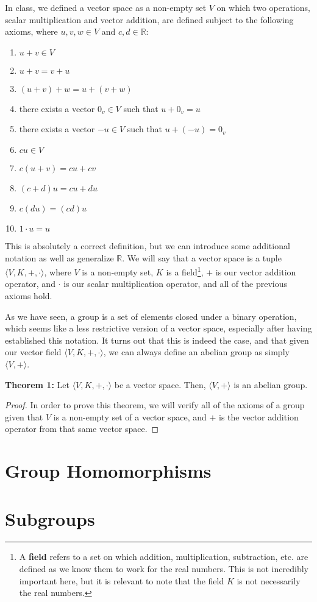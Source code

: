 \documentclass{article}
\newcommand{\R}{\mathbb{R}}
\newcommand{\done}{\renewcommand\qedsymbol{$\blacksquare$}}
\begin{document}
In class, we defined a vector space as a non-empty set $V$ on which two operations,
scalar multiplication and vector addition, are defined subject to the following axioms,
where $u,v,w \in V$ and $c,d \in \R$:
\begin{enumerate}
    \item $u+v \in V$
    \item $u+v = v+u$
    \item $(u+v)+w = u+(v+w)$
    \item there exists a vector $0_v \in V$ such that $u+0_v = u$
    \item there exists a vector $-u \in V$ such that $u+(-u) = 0_v$
    \item $cu\in V$
    \item $c(u+v) = cu+cv$
    \item $(c+d)u = cu+du$
    \item $c(du) = (cd)u$
    \item $1 \cdot u = u$
\end{enumerate}
This is absolutely a correct definition, but we can introduce some additional 
notation as well as generalize $\R$. We will say that a vector space is a tuple 
$\langle V, K, +, \cdot \rangle$, where $V$ is a non-empty set, $K$ is a field\footnote[2]{A \textbf{field} refers to a set on which addition, multiplication, subtraction, etc. are defined as we know them to work for the real numbers. This is not incredibly important here, but it is relevant to note that the field $K$ is not necessarily the real numbers.},
$+$ is our vector addition operator, and $\cdot$ is our scalar multiplication operator,
and all of the previous axioms hold.

As we have seen, a group is a set of elements closed under a binary operation, which 
seems like a less restrictive version of a vector space, especially after having 
established this notation. It turns out that this is indeed the case, and that 
given our vector field $\langle V, K, +, \cdot \rangle$, we can always define 
an abelian group as simply $\langle V, + \rangle$.

\begin{mdframed}[roundcorner=10pt, backgroundcolor=gray!10]
  \textbf{Theorem 1:} Let $\langle V, K, +, \cdot \rangle$ be a vector space. Then,
  $\langle V, + \rangle$ is an abelian group.
\end{mdframed}

\begin{proof}
    In order to prove this theorem, we will verify all of the axioms of a group
    given that $V$ is a non-empty set of a vector space, and $+$ is the vector 
    addition operator from that same vector space. 

\done  
\end{proof}


\section{Group Homomorphisms} 


\section{Subgroups}
\end{document}
